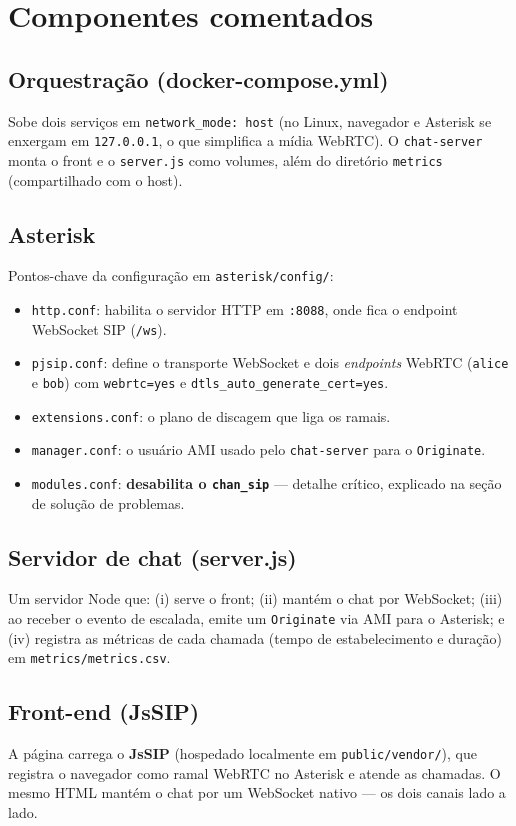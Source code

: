 \documentclass[11pt,a4paper]{article}
\begin{document}
\section{Componentes comentados}

\subsection{Orquestração (docker-compose.yml)}
Sobe dois serviços em \verb|network_mode: host| (no Linux, navegador e Asterisk se enxergam em
\verb|127.0.0.1|, o que simplifica a mídia WebRTC). O \verb|chat-server| monta o front e o
\verb|server.js| como volumes, além do diretório \verb|metrics| (compartilhado com o host).

\subsection{Asterisk}
Pontos-chave da configuração em \verb|asterisk/config/|:
\begin{itemize}[nosep]
  \item \verb|http.conf|: habilita o servidor HTTP em \verb|:8088|, onde fica o endpoint
  WebSocket SIP (\verb|/ws|).
  \item \verb|pjsip.conf|: define o transporte WebSocket e dois \emph{endpoints} WebRTC
  (\verb|alice| e \verb|bob|) com \verb|webrtc=yes| e \verb|dtls_auto_generate_cert=yes|.
  \item \verb|extensions.conf|: o plano de discagem que liga os ramais.
  \item \verb|manager.conf|: o usuário AMI usado pelo \verb|chat-server| para o
  \verb|Originate|.
  \item \verb|modules.conf|: \textbf{desabilita o \texttt{chan\_sip}} --- detalhe crítico,
  explicado na seção de solução de problemas.
\end{itemize}

\subsection{Servidor de chat (server.js)}
Um servidor Node que: (i) serve o front; (ii) mantém o chat por WebSocket; (iii) ao receber o
evento de escalada, emite um \verb|Originate| via AMI para o Asterisk; e (iv) registra as
métricas de cada chamada (tempo de estabelecimento e duração) em \verb|metrics/metrics.csv|.

\subsection{Front-end (JsSIP)}
A página carrega o \textbf{JsSIP} (hospedado localmente em \verb|public/vendor/|), que
registra o navegador como ramal WebRTC no Asterisk e atende as chamadas. O mesmo HTML mantém o
chat por um WebSocket nativo --- os dois canais lado a lado.
\end{document}
